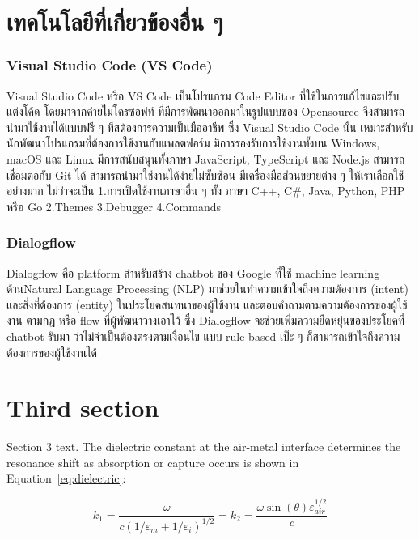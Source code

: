 \section{เทคโนโลยีที่เกี่ยวข้องอื่น ๆ}

\subsubsection{Visual Studio Code (VS Code)}
\quad Visual Studio Code หรือ VS Code เป็นโปรแกรม Code Editor ที่ใช้ในการแก้ไขและปรับแต่งโค้ด โดยมาจากค่ายไมโครซอฟท์ ที่มีการพัฒนาออกมาในรูปแบบของ Opensource จึงสามารถนำมาใช้งานได้แบบฟรี ๆ ทีสต้องการความเป็นมืออาชีพ ซึ่ง Visual Studio Code นั้น เหมาะสำหรับนักพัฒนาโปรแกรมที่ต้องการใช้งานกับแพลตฟอร์ม มีการรองรับการใช้งานทั้งบน Windows, macOS และ Linux มีการสนับสนุนทั้งภาษา  JavaScript, TypeScript และ Node.js สามารถเชื่อมต่อกับ  Git ได้ สามารถนำมาใช้งานได้ง่ายไม่ซับซ้อน มีเครื่องมือส่วนขยายต่าง ๆ ให้เราเลือกใช้อย่างมาก ไม่ว่าจะเป็น 1.การเปิดใช้งานภาษาอื่น ๆ ทั้ง ภาษา  C++,  C\#, Java, Python, PHP หรือ Go  2.Themes 3.Debugger 4.Commands 

\subsubsection{Dialogflow} 

\quad Dialogflow คือ platform สำหรับสร้าง chatbot ของ Google ที่ใช้ machine learning ด้านNatural Language Processing (NLP) มาช่วยในทำความเข้าใจถึงความต้องการ (intent) และสิ่งที่ต้องการ (entity) ในประโยคสนทนาของผู้ใช้งาน และตอบคำถามตามความต้องการของผู้ใช้งาน ตามกฎ หรือ flow ที่ผู้พัฒนาวางเอาไว้ ซึ่ง Dialogflow จะช่วยเพิ่มความยืดหยุ่นของประโยคที่ chatbot รับมา ว่าไม่จำเป็นต้องตรงตามเงื่อนไข แบบ rule based เป๊ะ ๆ ก็สามารถเข้าใจถึงความต้องการของผู้ใช้งานได้ 

\section{Third section}
Section 3 text. The dielectric constant
at the air-metal interface determines
the resonance shift as absorption or capture occurs
is shown in Equation~\eqref{eq:dielectric}:

\begin{equation}\label{eq:dielectric}
k_1=\frac{\omega}{c({1/\varepsilon_m + 1/\varepsilon_i})^{1/2}}=k_2=\frac{\omega
\sin(\theta)\varepsilon_\mathit{air}^{1/2}}{c}
\end{equation}

